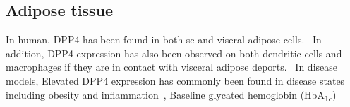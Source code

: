 \subsection{Adipose tissue}
In human, DPP4 has been found in both sc and viseral adipose cells.~\cite{Lamers2011} In addition, DPP4 expression has also been observed on both dendritic cells and macrophages if they are in contact with visceral adipose deports.~\cite{Zhong2013} In disease models, Elevated DPP4 expression has commonly been found in disease states including obesity and inflammation~\cite{Zhong2013},  Baseline glycated hemoglobin (HbA\textsubscript{1c}) 